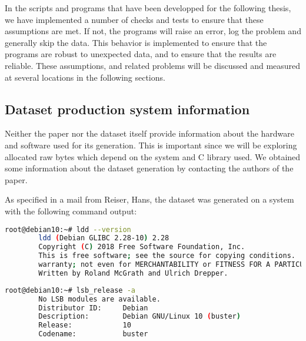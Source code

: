     In the scripts and programs that have been developped for the following thesis, we have implemented a number of checks and tests to ensure that these assumptions are met. If not, the programs will raise an error, log the problem and generally skip the data. This behavior is implemented to ensure that the programs are robust to unexpected data, and to ensure that the results are reliable. These assumptions, and related problems will be discussed and measured at several locations in the following sections.

    \subsection{Dataset production system information}\label{sec:methods:dataset:production_system_information}
    Neither the paper  nor the dataset itself provide information about the hardware and software used for its generation. This is important since we will be exploring allocated raw bytes which depend on the system and C library used. We obtained some information about the dataset generation by contacting the authors of the paper. 

    As specified in a mail from Reiser, Hans, the dataset was generated on a system with the following command output:

    \begin{minipage}{\dimexpr\linewidth-20pt}
    \begin{lstlisting}[language=bash, caption={Command and logs of the C-library version used for the dataset generation}]
        root@debian10:~# ldd --version
        ldd (Debian GLIBC 2.28-10) 2.28
        Copyright (C) 2018 Free Software Foundation, Inc.
        This is free software; see the source for copying conditions.  There is NO
        warranty; not even for MERCHANTABILITY or FITNESS FOR A PARTICULAR PURPOSE.
        Written by Roland McGrath and Ulrich Drepper.
    \end{lstlisting}
    \end{minipage}

    \begin{minipage}{\dimexpr\linewidth-20pt}
    \begin{lstlisting}[language=bash, caption={Command and logs of the Linux Standard Base Release used for the dataset generation}]
        root@debian10:~# lsb_release -a
        No LSB modules are available.
        Distributor ID:     Debian
        Description:        Debian GNU/Linux 10 (buster)
        Release:            10
        Codename:           buster
    \end{lstlisting}
    \end{minipage}

